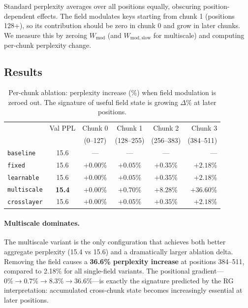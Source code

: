 \documentclass[11pt,a4paper]{article}
\begin{document}
Standard perplexity averages over all positions equally, obscuring
position-dependent effects.  The field modulates keys starting from
chunk 1 (positions 128+), so its contribution should be zero in
chunk 0 and grow in later chunks.  We measure this by zeroing
$W_{\mathrm{mod}}$ (and $W_{\mathrm{mod,slow}}$ for multiscale) and
computing per-chunk perplexity change.

\subsection{Results}

\begin{table}[h]
\centering
\caption{Per-chunk ablation: perplexity increase (\%) when field
  modulation is zeroed out.  The signature of useful field state
  is growing $\Delta$\% at later positions.}
\label{tab:ablation}
\begin{tabular}{@{}lccccr@{}}
\toprule
& Val PPL & Chunk 0 & Chunk 1 & Chunk 2 & Chunk 3 \\
& & (0--127) & (128--255) & (256--383) & (384--511) \\
\midrule
\texttt{baseline}   & 15.6 & --- & --- & --- & --- \\
\texttt{fixed}      & 15.6 & $+0.00$\% & $+0.05$\% & $+0.35$\% & $+2.18$\% \\
\texttt{learnable}  & 15.6 & $+0.00$\% & $+0.05$\% & $+0.35$\% & $+2.18$\% \\
\texttt{multiscale} & \textbf{15.4} & $+0.00$\% & $+0.70$\% & $+8.28$\% & $\mathbf{+36.60}$\% \\
\texttt{crosslayer} & 15.6 & $+0.00$\% & $+0.05$\% & $+0.35$\% & $+2.18$\% \\
\bottomrule
\end{tabular}
\end{table}

\paragraph{Multiscale dominates.}  The multiscale variant is the only
configuration that achieves both better aggregate perplexity (15.4 vs
15.6) and a dramatically larger ablation delta.  Removing the field
causes a \textbf{36.6\% perplexity increase} at positions 384--511,
compared to 2.18\% for all single-field variants.  The positional
gradient---$0\% \to 0.7\% \to 8.3\% \to 36.6\%$---is exactly the
signature predicted by the RG interpretation: accumulated cross-chunk
state becomes increasingly essential at later positions.
\end{document}
